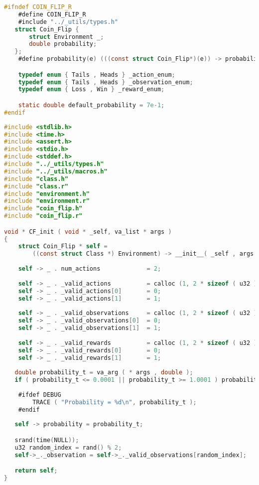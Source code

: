 \documentclass[fancychapters]{report}   	%
\begin{document}
\begin{lstlisting}[language=C,caption={coin_flip.r}]
#ifndef COIN_FLIP_R
    #define COIN_FLIP_R
    #include "../_utils/types.h"
   struct Coin_Flip {
       struct Environment _;
       double probability;       
   };
    #define probability(e) (((const struct Coin_Flip*)(e)) -> probability)

    typedef enum { Tails , Heads } _action_enum;
    typedef enum { Tails , Heads } _observation_enum;
    typedef enum { Loss , Win } _reward_enum;

    static double default_probability = 7e-1;
#endif
\end{lstlisting}
\begin{lstlisting}[language=C,caption={coin_flip.c}]
#include <stdlib.h>
#include <time.h>
#include <assert.h>
#include <stdio.h>
#include <stddef.h>
#include "../_utils/types.h"
#include "../_utils/macros.h"
#include "class.h"
#include "class.r"
#include "environment.h"
#include "environment.r"
#include "coin_flip.h"
#include "coin_flip.r"

void * CF_init ( void * _self, va_list * args ) 
{
    struct Coin_Flip * self =
        ((const struct Class *) Environment) -> __init__( _self , args );
    
    self -> _ . num_actions             = 2;
    
    self -> _ . _valid_actions          = calloc (1, 2 * sizeof ( u32 ) );
    self -> _ . _valid_actions[0]       = 0;
    self -> _ . _valid_actions[1]       = 1;
       
    self -> _ . _valid_observations     = calloc (1, 2 * sizeof ( u32 ) );
    self -> _ . _valid_observations[0]  = 0;
    self -> _ . _valid_observations[1]  = 1;
   
    self -> _ . _valid_rewards          = calloc (1, 2 * sizeof ( u32 ) );
    self -> _ . _valid_rewards[0]       = 0;
    self -> _ . _valid_rewards[1]       = 1;
   
   double probability_t = va_arg ( * args , double );
   if ( probability_t <= 0.0001 || probability_t >= 1.0001 ) probability_t = 0.7;
    
    #ifdef DEBUG
        TRACE ( "Probability = %d\n", probability_t );
    #endif
    
   self -> probability = probability_t;

   srand(time(NULL));
   u32 random_index = rand() % 2;
   self->_._observation = self->_._valid_observations[random_index];

   return self;
}


\end{lstlisting}
\end{document}
